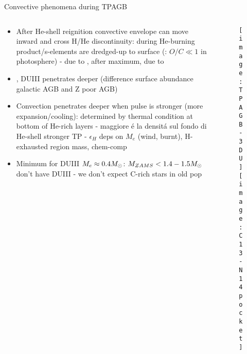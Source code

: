 \begin{frame}{Convective phenomena during TPAGB}
\begin{columns}[T]
\begin{column}{0.5\textwidth}
\begin{itemize}
\item After He-shell reignition convective envelope can move inward and cross H/He discontinuity: during  He-burning product/s-elements are dredged-up to surface (: $O/C\ll1$ in photosphere) -  due to , after maximum,  due to 
\item {}, DUIII penetrates deeper (difference surface abundance galactic AGB and Z poor AGB)
\item Convection penetrates deeper when pulse is stronger (more expansion/cooling): determined by thermal condition at bottom of He-rich layers -  maggiore \'e la densit\'a sul fondo di He-shell stronger TP - $\epsilon_H$ deps on $M_e$ (wind, burnt), H-exhausted region mass, chem-comp
\item Minimum for DUIII $M_e\approx0.4M_{\odot}$: $M_{ZAMS}<1.4-1.5M_{\odot}$ don't have DUIII - we don't expect C-rich stars in old pop
\end{itemize}
\end{column}
\begin{column}{0.5\textwidth}
\begin{figure}[!ht]
\texttt{[image: TPAGB-3DU]}\label{fig:TPAGB-3DU}
\texttt{[image: C13-N14pocket]}\label{fig:C13-N14pocket}
\end{figure}
\end{column}\end{columns}
\end{frame}

